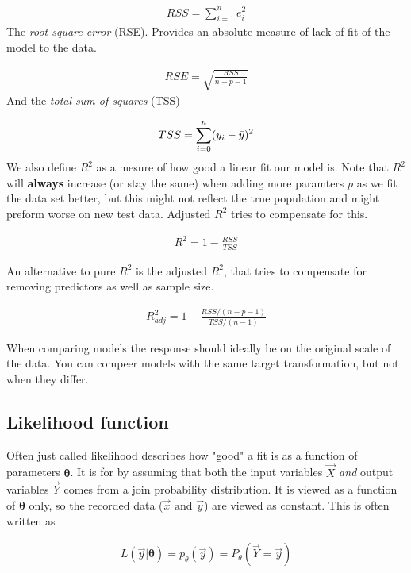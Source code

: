 \documentclass{article}
\newcommand{\vecsym}[1]{\boldsymbol{#1}} %
\begin{document}
\begin{align*}
    RSS = \sum_{i=1}^{n} e_i^2
\end{align*}
The \textit{root square error} (RSE). Provides an absolute measure of lack of fit of the model to the data.

\begin{align*}
    RSE = \sqrt{\frac{RSS}{n-p-1}}
\end{align*}
And the \textit{total sum of squares} (TSS)

\begin{align*}
    TSS = \sum_{i=0}^{n} (y_i - \Bar{y})^2
\end{align*}
We also define $R^2$ as a mesure of how good a linear fit our model is. Note that $R^2$ will \textbf{always} increase (or stay the same) when adding more paramters $p$ as we fit the data set better, but this might not reflect the true population and might preform worse on new test data. Adjusted $R^2$ tries to compensate for this.

\begin{align*}
    R^2 = 1 - \frac{RSS}{TSS}
\end{align*}

An alternative to pure $R^2$ is the adjusted $R^2$, that tries to compensate for removing predictors as well as sample size.

\begin{align}
    R^2_{adj} = 1-\frac{RSS/(n-p-1)}{TSS/(n-1)}
\end{align}

When comparing models the response should ideally be on the original scale of the data. You can compeer models with the same target transformation, but not when they differ.

\subsection{Likelihood function}
Often just called likelihood describes how "good" a fit is as a function of parameters $\vecsym{\theta}$. It is for by assuming that both the input variables $\Vec{X}$ \textit{and} output variables $\Vec{Y}$ comes from a join probability distribution. It is viewed as a function of $\vecsym{\theta}$ only, so the recorded data ($\Vec{x} \text{ and } \Vec{y}$) are viewed as constant. This is often written as 

\begin{align*}
    L(\Vec{y}|\vecsym{\theta}) = p_{\theta}(\Vec{y}) = P_{\theta}(\Vec{Y}=\Vec{y})
\end{align*}
\end{document}
